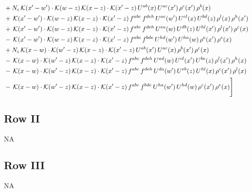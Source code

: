 \documentclass[9pt]{article}
\numberwithin{equation}{section}
\begin{document}
\begin{align}
&+N_{c}\,\mathcal{K}(x'-w')\cdot\mathcal{K}(w-z)\,\mathcal{K}(x-z)\cdot\mathcal{K}(x'-z)\,U^{ab}(x)\,U^{ac}(x')\,\rho^{c}(x')\,\rho^{b}(x)\notag \\ 
&+\,\mathcal{K}(x'-w')\cdot\mathcal{K}(w-z)\,\mathcal{K}(x-z)\cdot\mathcal{K}(x'-z)\,f^{abc}\,f^{deh}\,U^{ae}(w')\,U^{cl}(x)\,U^{bd}(z)\,\rho^{l}(x)\,\rho^{h}(x')\notag \\ 
&+\,\mathcal{K}(x'-w')\cdot\mathcal{K}(w-z)\,\mathcal{K}(x-z)\cdot\mathcal{K}(x'-z)\,f^{abc}\,f^{deh}\,U^{ea}(w)\,U^{db}(z)\,U^{hl}(x')\,\rho^{l}(x')\,\rho^{c}(x)\notag \\ 
&-\,\mathcal{K}(x'-w')\cdot\mathcal{K}(w-z)\,\mathcal{K}(x-z)\cdot\mathcal{K}(x'-z)\,f^{abc}\,f^{bde}\,U^{hd}(w')\,U^{ha}(w)\,\rho^{e}(x')\,\rho^{c}(x)\notag \\ 
&+N_{c}\,\mathcal{K}(x-w)\cdot\mathcal{K}(w'-z)\,\mathcal{K}(x-z)\cdot\mathcal{K}(x'-z)\,U^{ab}(x')\,U^{ac}(x)\,\rho^{b}(x')\,\rho^{c}(x)\notag \\ 
&-\,\mathcal{K}(x-w)\cdot\mathcal{K}(w'-z)\,\mathcal{K}(x-z)\cdot\mathcal{K}(x'-z)\,f^{abc}\,f^{deh}\,U^{ad}(w)\,U^{cl}(x')\,U^{be}(z)\,\rho^{l}(x')\,\rho^{h}(x)\notag \\ 
&-\,\mathcal{K}(x-w)\cdot\mathcal{K}(w'-z)\,\mathcal{K}(x-z)\cdot\mathcal{K}(x'-z)\,f^{abc}\,f^{deh}\,U^{da}(w')\,U^{eb}(z)\,U^{hl}(x)\,\rho^{c}(x')\,\rho^{l}(x)\notag \\ 
&-\,\mathcal{K}(x-w)\cdot\mathcal{K}(w'-z)\,\mathcal{K}(x-z)\cdot\mathcal{K}(x'-z)\,f^{abc}\,f^{bde}\,U^{ha}(w')\,U^{hd}(w)\,\rho^{c}(x')\,\rho^{e}(x)\Bigg]
\end{align}
\subsection{Row II}
\textsc{NA}
\subsection{Row III}
\textsc{NA}
\end{document}
